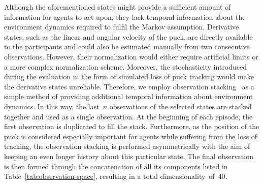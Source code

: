 \documentclass{article}
\begin{document}
Although the aforementioned states might provide a sufficient amount of information for agents to act upon, they lack temporal information about the environment dynamics required to fulfil the Markov assumption. Derivative states, such as the linear and angular velocity of the puck, are directly available to the participants and could also be estimated manually from two consecutive observations. However, their normalization would either require artificial limits or a more complex normalization scheme. Moreover, the stochasticity introduced during the evaluation in the form of simulated loss of puck tracking would make the derivative states unreliable. Therefore, we employ observation stacking~\cite{mnih2015human} as a simple method of providing additional temporal information about environment dynamics. In this way, the last~\(n\) observations of the selected states are stacked together and used as a single observation. At the beginning of each episode, the first observation is duplicated to fill the stack. Furthermore, as the position of the puck is considered especially important for agents while suffering from the loss of tracking, the observation stacking is performed asymmetrically with the aim of keeping an even longer history about this particular state. The final observation is then formed through the concatenation of all its components listed in Table~\ref{tab:observation-space}, resulting in a total dimensionality~of~\(40\).
\end{document}

